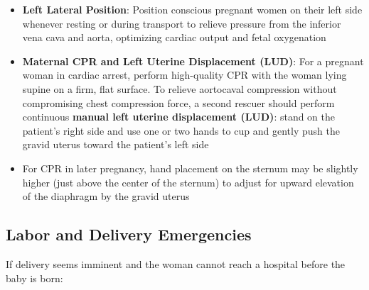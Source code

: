 \begin{itemize}[leftmargin=*]
  \item \textbf{Left Lateral Position}: Position conscious pregnant women on their left side whenever resting or during transport to relieve pressure from the inferior vena cava and aorta, optimizing cardiac output and fetal oxygenation \cite{ilcor_2025}
  \item \textbf{Maternal CPR and Left Uterine Displacement (LUD)}: For a pregnant woman in cardiac arrest, perform high-quality CPR with the woman lying supine on a firm, flat surface. To relieve aortocaval compression without compromising chest compression force, a second rescuer should perform continuous \textbf{manual left uterine displacement (LUD)}: stand on the patient's right side and use one or two hands to cup and gently push the gravid uterus toward the patient's left side \cite{aha_arc_2024,ilcor_2025}
  \item For CPR in later pregnancy, hand placement on the sternum may be slightly higher (just above the center of the sternum) to adjust for upward elevation of the diaphragm by the gravid uterus
\end{itemize}

\subsection{Labor and Delivery Emergencies}

If delivery seems imminent and the woman cannot reach a hospital before the baby is born:

